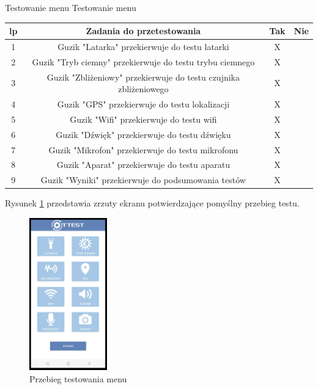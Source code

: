 \begin{tabela}
	{Testowanie menu}	%
	{Testowanie menu}	%
	{
		\begin{tabular}{|c|c|c|c|} \hline
			\textbf{lp} & \textbf{Zadania do przetestowania} & \textbf{Tak} & \textbf{Nie} \\ \hline
			1 & Guzik "Latarka" przekierwuje do testu latarki & X & ~ \\ \hline
			2 & Guzik "Tryb ciemny" przekierwuje do testu trybu ciemnego & X & ~ \\ \hline
			3 & Guzik "Zbliżeniowy" przekierwuje do testu czujnika zbliżeniowego & X & ~ \\ \hline
			4 & Guzik "GPS" przekierwuje do testu lokalizacji & X & ~ \\ \hline
			5 & Guzik "Wifi" przekierwuje do testu wifi & X & ~ \\ \hline
			6 & Guzik "Dźwięk" przekierwuje do testu dźwięku & X & ~ \\ \hline
			7 & Guzik "Mikrofon" przekierwuje do testu mikrofonu & X & ~ \\ \hline
			8 & Guzik "Aparat" przekierwuje do testu aparatu & X & ~ \\ \hline
			9 & Guzik "Wyniki" przekierwuje do podsumowania testów & X & ~ \\ \hline
	\end{tabular}	}
	\label{tab:tablica_menu}
\end{tabela}

Rysunek \ref{rys:menu} przedstawia zrzuty ekranu potwierdzające pomyślny przebieg testu.

\begin{figure}[!hbt]
	\begin{center}
		\includegraphics[angle=360, width=0.30\textwidth]{rys/punkt5/menu.png}
		\caption{Przebieg testowania menu}
		\label{rys:menu}
	\end{center}
\end{figure}   

